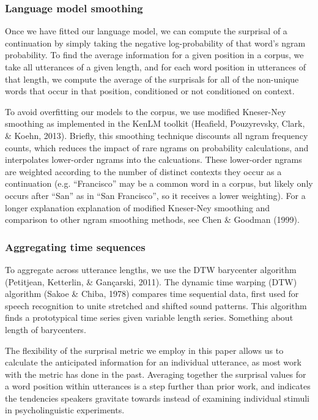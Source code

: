 \documentclass[10pt, letterpaper]{article}
\begin{document}
\hypertarget{language-model-smoothing}{%
\subsubsection{Language model
smoothing}\label{language-model-smoothing}}

Once we have fitted our language model, we can compute the surprisal of
a continuation by simply taking the negative log-probability of that
word's ngram probability. To find the average information for a given
position in a corpus, we take all utterances of a given length, and for
each word position in utterances of that length, we compute the average
of the surprisals for all of the non-unique words that occur in that
position, conditioned or not conditioned on context.

To avoid overfitting our models to the corpus, we use modified
Kneser-Ney smoothing as implemented in the KenLM toolkit (Heafield,
Pouzyrevsky, Clark, \& Koehn, 2013). Briefly, this smoothing technique
discounts all ngram frequency counts, which reduces the impact of rare
ngrams on probability calculations, and interpolates lower-order ngrams
into the calcuations. These lower-order ngrams are weighted according to
the number of distinct contexts they occur as a continuation (e.g.
``Francisco'' may be a common word in a corpus, but likely only occurs
after ``San'' as in ``San Francisco'', so it receives a lower
weighting). For a longer explanation explanation of modified Kneser-Ney
smoothing and comparison to other ngram smoothing methods, see Chen \&
Goodman (1999).

\hypertarget{aggregating-time-sequences}{%
\subsubsection{Aggregating time
sequences}\label{aggregating-time-sequences}}

To aggregate across utterance lengths, we use the DTW barycenter
algorithm (Petitjean, Ketterlin, \& Gançarski, 2011). The dynamic time
warping (DTW) algorithm (Sakoe \& Chiba, 1978) compares time sequential
data, first used for speech recognition to unite stretched and shifted
sound patterns. This algorithm finds a prototypical time series given
variable length series. Something about length of barycenters.

The flexibility of the surprisal metric we employ in this paper allows
us to calculate the anticipated information for an individual utterance,
as most work with the metric has done in the past. Averaging together
the surprisal values for a word position within utterances is a step
further than prior work, and indicates the tendencies speakers gravitate
towards instead of examining individual stimuli in psycholinguistic
experiments.
\end{document}
